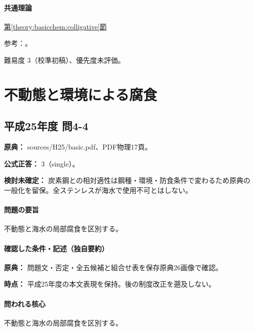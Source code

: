 \paragraph{共通理論} \hyperref[theory:basicchem:colligative]{第\ref*{theory:basicchem:colligative}節}

\par 参考：\cite{chem55_colligative}。

\par 難易度 3（校準初稿）、優先度未評価。

\section{不動態と環境による腐食}

\subsection{平成25年度 問4-4}
\label{q:h25-reg-basic-4-4}

\noindent\textbf{原典：} sources/H25/basic.pdf、PDF物理17頁。

\textbf{公式正答：} 3（single）。

\par\textbf{検討未確定：} 炭素鋼との相対適性は鋼種・環境・防食条件で変わるため原典の一般化を留保。全ステンレスが海水で使用不可とはしない。

\paragraph{問題の要旨} 不動態と海水の局部腐食を区別する。

\paragraph{確認した条件・記述（独自要約）}\mbox{}\par

\noindent\textbf{原典：} 問題文・否定・全五候補と組合せ表を保存原典26画像で確認。\par

\noindent\textbf{時点：} 平成25年度の本文表現を保持。後の制度改正を遡及しない。\par

\paragraph{問われる核心} 不動態と海水の局部腐食を区別する。

